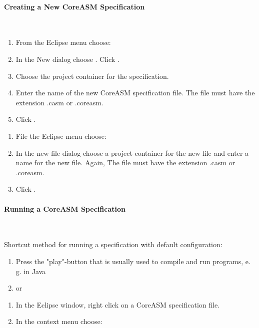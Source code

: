 \documentclass{article}
\newcommand{\CoreASM}{{\sffamily CoreASM}\xspace}
\begin{document}
\paragraph{Creating a New \CoreASM Specification} ~


\begin{enumerate}
	\item From the Eclipse menu choose: 
	\item In the New dialog choose . Click .
    \item Choose the project container for the specification.
    \item Enter the name of the new \CoreASM specification file. The file must have the extension {\ttfamily .casm} or {\ttfamily .coreasm}. 
	\item Click . 
\end{enumerate}


\begin{enumerate}
    \item File the Eclipse menu choose: 
    \item In the new file dialog choose a project container for the new file and enter a name for the new file. Again, The file must have the extension {\ttfamily .casm} or {\ttfamily .coreasm}.
    \item Click . 
\end{enumerate}

\paragraph{Running a \CoreASM Specification} ~


Shortcut method for running a specification with default configuration:

\begin{enumerate}
    \item Press the "play"-button that is usually used to compile and run programs, e.\,g. in Java
    \item[] or
    \vspace{-1em}
\end{enumerate}
\begin{enumerate}
    \item In the Eclipse window, right click on a \CoreASM specification file.
    \item In the context menu choose:  
\end{enumerate}
\end{document}
